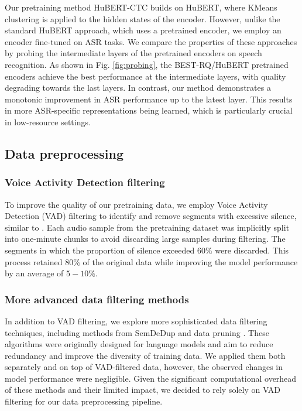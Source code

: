 \documentclass{Interspeech}
\begin{document}
Our pretraining method HuBERT-CTC builds on HuBERT, where KMeans clustering is applied to the hidden states of the encoder. However, unlike the standard HuBERT approach, which uses a pretrained encoder, we employ an encoder fine-tuned on ASR tasks. We compare the properties of these approaches by probing the intermediate layers of the pretrained encoders on speech recognition. As shown in Fig. \ref{fig:probing}, the BEST-RQ/HuBERT pretrained encoders achieve the best performance at the intermediate layers, with quality degrading towards the last layers. In contrast, our method demonstrates a monotonic improvement in ASR performance up to the latest layer. This results in more ASR-specific representations being learned, which is particularly crucial in low-resource settings.

\subsection{Data preprocessing}

\subsubsection{Voice Activity Detection filtering}

To improve the quality of our pretraining data, we employ Voice Activity Detection (VAD) filtering to identify and remove segments with excessive silence, similar to \cite{assembly_conformer, usm}. Each audio sample from the pretraining dataset was implicitly split into one-minute chunks to avoid discarding large samples during filtering. The segments in which the proportion of silence exceeded $60\%$ were discarded. This process retained $80\%$ of the original data while improving the model performance by an average of $5-10\%$.

\subsubsection{More advanced data filtering methods}

In addition to VAD filtering, we explore more sophisticated data filtering techniques, including methods from SemDeDup \cite{semdedup} and data pruning \cite{ssl_pruning}. These algorithms were originally designed for language models and aim to reduce redundancy and improve the diversity of training data. We applied them both separately and on top of VAD-filtered data, however, the observed changes in model performance were negligible. Given the significant computational overhead of these methods and their limited impact, we decided to rely solely on VAD filtering for our data preprocessing pipeline.
\end{document}
